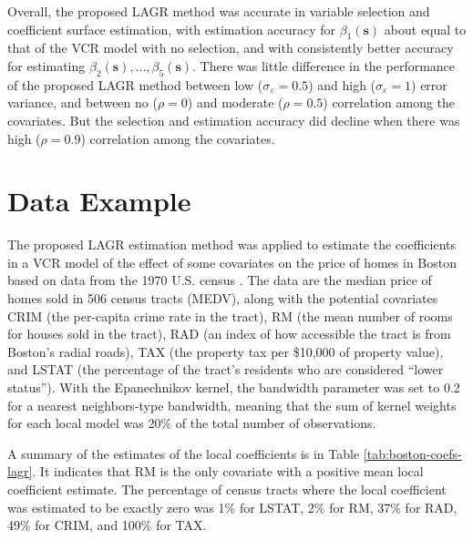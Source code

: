 \documentclass[authoryear,review, 12pt]{elsarticle}
\begin{document}
Overall, the proposed LAGR method was accurate in variable selection
and coefficient surface estimation, with estimation accuracy for $\beta_{1}(\bm{s})$
about equal to that of the VCR model with no selection, and with consistently
better accuracy for estimating $\beta_{2}(\bm{s}),\dots,\beta_{5}(\bm{s})$.
There was little difference in the performance of the proposed LAGR
method between low ($\sigma_{\varepsilon}=0.5$) and high ($\sigma_{\varepsilon}=1$)
error variance, and between no ($\rho=0$) and moderate ($\rho=0.5$)
correlation among the covariates. But the selection and estimation
accuracy did decline when there was high ($\rho=0.9$) correlation
among the covariates.


\section{Data Example\label{sec:example}}




The proposed LAGR estimation method was applied to estimate the coefficients
in a VCR model of the effect of some covariates on the price of homes
in Boston based on data from the 1970 U.S. census \citep{Harrison-Rubinfeld-1978,Gilley-Pace-1996,Pace-Gilley-1997}.
The data are the median price of homes sold in 506 census tracts (MEDV),
along with the potential covariates CRIM (the per-capita crime rate
in the tract), RM (the mean number of rooms for houses sold in the
tract), RAD (an index of how accessible the tract is from Boston's
radial roads), TAX (the property tax per \$10,000 of property value),
and LSTAT (the percentage of the tract's residents who are considered
``lower status''). With the Epanechnikov kernel, the bandwidth parameter
was set to 0.2 for a nearest neighbors-type bandwidth, meaning that
the sum of kernel weights for each local model was 20\% of the total
number of observations.

A summary of the estimates of the local coefficients is in Table \ref{tab:boston-coefs-lagr}.
It indicates that RM is the only covariate with a positive mean local
coefficient estimate. The percentage of census tracts where the local
coefficient was estimated to be exactly zero was 1\%
for LSTAT, 2\%
for RM, 37\%
for RAD, 49\%
for CRIM, and 100\%
for TAX.
\end{document}
